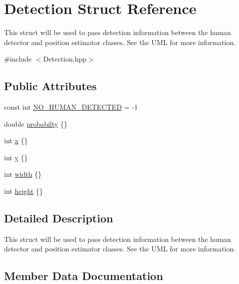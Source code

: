 \hypertarget{struct_detection}{}\section{Detection Struct Reference}
\label{struct_detection}


This struct will be used to pass detection information between the human detector and position estimator classes. See the U\+ML for more information.  




{\ttfamily \#include $<$Detection.\+hpp$>$}

\subsection*{Public Attributes}
\begin{DoxyCompactItemize}
\item 
const int \hyperlink{struct_detection_a12871dcbd7a9d16cdc3c5443db2bd356}{N\+O\+\_\+\+H\+U\+M\+A\+N\+\_\+\+D\+E\+T\+E\+C\+T\+ED} = -\/1
\item 
double \hyperlink{struct_detection_abcfbc8fb8adf19f178bfcbc036f3bbfb}{probabilty} \{\}
\item 
int \hyperlink{struct_detection_a7b71921325261514cd6dd42c8e90ba70}{x} \{\}
\item 
int \hyperlink{struct_detection_afa5d065ea13ce74dfd52c6a569313270}{y} \{\}
\item 
int \hyperlink{struct_detection_af88e469657d3bc4807caff6c5f9e9475}{width} \{\}
\item 
int \hyperlink{struct_detection_a4f3d0bf4072f7e5a200767ab3d838fe2}{height} \{\}
\end{DoxyCompactItemize}


\subsection{Detailed Description}
This struct will be used to pass detection information between the human detector and position estimator classes. See the U\+ML for more information. 

\subsection{Member Data Documentation}
\mbox{\label{struct_detection_a4f3d0bf4072f7e5a200767ab3d838fe2}} 
